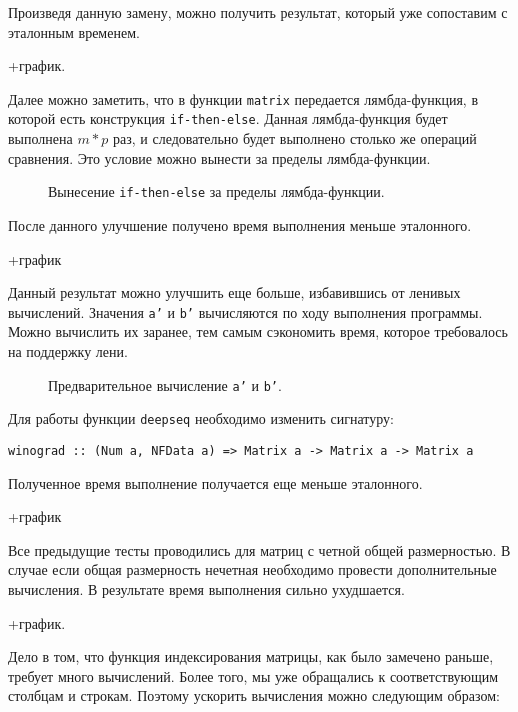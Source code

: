 \documentclass[a4paper,12pt,russian]{article}
\begin{document}
	Произведя данную замену, можно получить результат, который уже сопоставим с эталонным временем.
	
	+график.
	
	Далее можно заметить, что в функции \texttt{matrix} передается лямбда-функция, в которой есть конструкция \texttt{if-then-else}. Данная лямбда-функция будет выполнена \(m*p\) раз, и следовательно будет выполнено столько же операций сравнения. Это условие можно вынести за пределы лямбда-функции.
	
	\begin{figure}[H]
		\caption{Вынесение \texttt{if-then-else} за пределы лямбда-функции.}
		
	\end{figure}
	
	После данного улучшение получено время выполнения меньше эталонного.
	
	+график
	
	Данный результат можно улучшить еще больше, избавившись от ленивых вычислений. Значения \texttt{a'} и \texttt{b'} вычисляются по ходу выполнения программы. Можно вычислить их заранее, тем самым сэкономить время, которое требовалось на поддержку лени. 
	
	\begin{figure}[H]
		\caption{Предварительное вычисление \texttt{a'} и \texttt{b'}.}
		
	\end{figure}
	
	Для работы функции \texttt{deepseq} необходимо изменить сигнатуру:
	
	\begin{lstlisting} 
winograd :: (Num a, NFData a) => Matrix a -> Matrix a -> Matrix a
	\end{lstlisting}
	
	Полученное время выполнение получается еще меньше эталонного.
	
	+график
	
	Все предыдущие тесты проводились для матриц с четной общей размерностью. В случае если общая размерность нечетная необходимо провести дополнительные вычисления. 
	В результате время выполнения сильно ухудшается.
	
	+график.
	
	Дело в том, что функция индексирования матрицы, как было замечено раньше, требует много вычислений. Более того, мы уже обращались к соответствующим столбцам и строкам. Поэтому ускорить вычисления можно следующим образом:	
	
\end{document}
